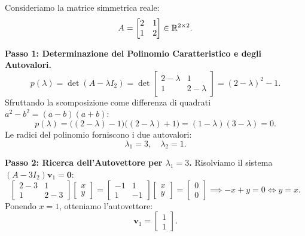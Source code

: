 \begin{example}
\label{ex:autovalori-2x2}
Consideriamo la matrice simmetrica reale:
\begin{equation}
    A = \begin{bmatrix} 2 & 1 \\ 1 & 2 \end{bmatrix} \in \mathbb{R}^{2 \times 2}.
\end{equation}

\noindent\textbf{Passo 1: Determinazione del Polinomio Caratteristico e degli Autovalori.}
\begin{equation}
    p(\lambda) = \det(A - \lambda I_2) = \det \begin{bmatrix} 2-\lambda & 1 \\ 1 & 2-\lambda \end{bmatrix} = (2-\lambda)^2 - 1.
\end{equation}
Sfruttando la scomposizione come differenza di quadrati $a^2 - b^2 = (a-b)(a+b)$:
\begin{equation}
    p(\lambda) = \big((2-\lambda) - 1\big)\big((2-\lambda) + 1\big) = (1-\lambda)(3-\lambda) = 0.
\end{equation}
Le radici del polinomio forniscono i due autovalori:
\begin{equation}
    \lambda_1 = 3, \quad \lambda_2 = 1.
\end{equation}

\noindent\textbf{Passo 2: Ricerca dell'Autovettore per $\lambda_1 = 3$.}
Risolviamo il sistema $(A - 3I_2)\mathbf{v}_1 = \mathbf{0}$:
\begin{equation}
    \begin{bmatrix} 2-3 & 1 \\ 1 & 2-3 \end{bmatrix} \begin{bmatrix} x \\ y \end{bmatrix} = \begin{bmatrix} -1 & 1 \\ 1 & -1 \end{bmatrix} \begin{bmatrix} x \\ y \end{bmatrix} = \begin{bmatrix} 0 \\ 0 \end{bmatrix} \implies -x + y = 0 \iff y = x.
\end{equation}
Ponendo $x = 1$, otteniamo l'autovettore:
\begin{equation}
    \mathbf{v}_1 = \begin{bmatrix} 1 \\ 1 \end{bmatrix}.
\end{equation}


\end{example}
